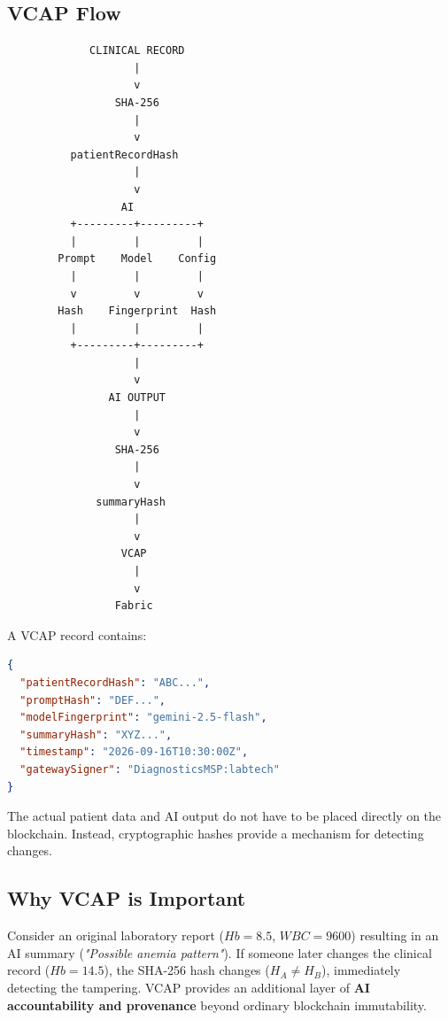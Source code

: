 \documentclass[11pt,a4paper]{article}
\begin{document}
\subsection{VCAP Flow}
\begin{lstlisting}
             CLINICAL RECORD
                    |
                    v
                 SHA-256
                    |
                    v
          patientRecordHash
                    |
                    v
                  AI
          +---------+---------+
          |         |         |
        Prompt    Model    Config
          |         |         |
          v         v         v
        Hash    Fingerprint  Hash
          |         |         |
          +---------+---------+
                    |
                    v
                AI OUTPUT
                    |
                    v
                 SHA-256
                    |
                    v
              summaryHash
                    |
                    v
                  VCAP
                    |
                    v
                 Fabric
\end{lstlisting}

A VCAP record contains:
\begin{lstlisting}[language=json]
{
  "patientRecordHash": "ABC...",
  "promptHash": "DEF...",
  "modelFingerprint": "gemini-2.5-flash",
  "summaryHash": "XYZ...",
  "timestamp": "2026-09-16T10:30:00Z",
  "gatewaySigner": "DiagnosticsMSP:labtech"
}
\end{lstlisting}

The actual patient data and AI output do not have to be placed directly on the blockchain. Instead, cryptographic hashes provide a mechanism for detecting changes.

\subsection{Why VCAP is Important}
Consider an original laboratory report ($Hb = 8.5$, $WBC = 9600$) resulting in an AI summary (\textit{"Possible anemia pattern"}). If someone later changes the clinical record ($Hb = 14.5$), the SHA-256 hash changes ($H_A \neq H_B$), immediately detecting the tampering. VCAP provides an additional layer of \textbf{AI accountability and provenance} beyond ordinary blockchain immutability.

\newpage
\end{document}

